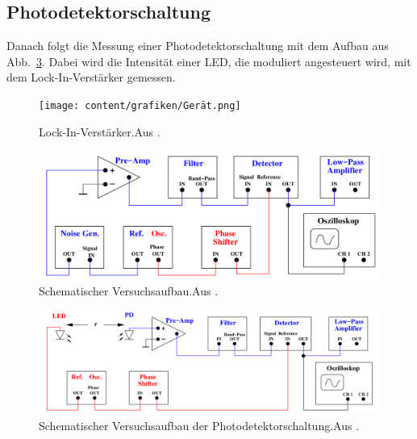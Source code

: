 \subsection{Photodetektorschaltung}
Danach folgt die Messung einer Photodetektorschaltung mit dem Aufbau aus Abb.~\ref{fig:aufbau2}. Dabei wird die Intensität einer LED, die moduliert angesteuert wird, mit dem Lock-In-Verstärker gemessen.

\begin{figure}
  \centering
  \texttt{[image: content/grafiken/Gerät.png]}
  \caption{Lock-In-Verstärker.Aus \cite{anleitung303}.}
  \label{fig:lockin}
\end{figure}

\begin{figure}
  \centering
  \includegraphics[width=\textwidth]{content/grafiken/Aufbau.png}
  \caption{Schematischer Versuchsaufbau.Aus \cite{anleitung303}.}
  \label{fig:aufbau}
\end{figure}

\begin{figure}
  \centering
  \includegraphics[width=\textwidth]{content/grafiken/Aufbau2.png}
  \caption{Schematischer Versuchsaufbau der Photodetektorschaltung.Aus \cite{anleitung303}.}
  \label{fig:aufbau2}
\end{figure}
